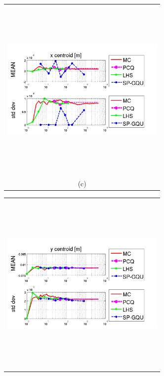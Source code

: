\documentclass{article}
\newcommand{\Pic}[2][0.85]{\begin{center}\texttt{[image: \#2]}
 \end{center} }
\begin{document}
\begin{figure}[H]
\begin{minipage}[b]{0.6\textwidth}
\begin{tabular}{c}
        \end{tabular}
    \end{minipage}
    \begin{minipage}{0.6\textwidth}
        \begin{tabular}{c}
	\includegraphics[width=8cm,height=9cm,keepaspectratio]{fig/picsgqu/trei_GQU.jpg}\\
        (c)
        \end{tabular}
    \end{minipage}
   \begin{minipage}[c]{0.6\textwidth}
       \begin{tabular}{c}
       \includegraphics[width=8cm,height=9cm,keepaspectratio]{fig/picsgqu/patru_GQU.jpg}\\

\end{tabular}
\end{minipage}
\end{figure}
\end{document}
